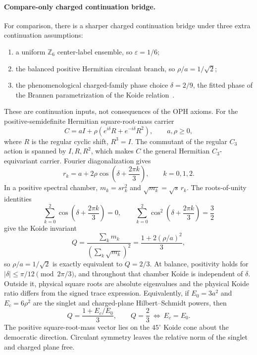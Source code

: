 \documentclass[11pt]{article}
\begin{document}
\paragraph{Compare-only charged continuation bridge.}
For comparison, there is a sharper charged continuation bridge under three extra continuation
assumptions:
\begin{enumerate}[leftmargin=2em]
\item a uniform \(\mathbb Z_6\) center-label ensemble, so \(\varepsilon = 1/6\);
\item the balanced positive Hermitian circulant branch, so \(\rho/a = 1/\sqrt2\);
\item the phenomenological charged-family phase choice \(\delta = 2/9\), the fitted phase of the
Brannen parametrization of the Koide relation~\cite{koide1983,brannen2006}.
\end{enumerate}
These are continuation inputs, not consequences of the OPH axioms.  For the positive-semidefinite
Hermitian square-root-mass carrier
\[
C=aI+\rho\left(e^{i\delta}R+e^{-i\delta}R^2\right),
\qquad a,\rho\geq0,
\]
where \(R\) is the regular cyclic shift, \(R^3=I\).  The commutant of the regular \(C_3\)
action is spanned by \(I,R,R^2\), which makes \(C\) the general Hermitian
\(C_3\)-equivariant carrier. Fourier diagonalization gives
\[
r_k=a+2\rho\cos\!\left(\delta+\frac{2\pi k}{3}\right),
\qquad k=0,1,2.
\]
In a positive spectral chamber, \(m_k=s r_k^2\) and
\(\sqrt{m_k}=\sqrt{s}\,r_k\).  The roots-of-unity identities
\[
\sum_{k=0}^2\cos\!\left(\delta+\frac{2\pi k}{3}\right)=0,
\qquad
\sum_{k=0}^2\cos^2\!\left(\delta+\frac{2\pi k}{3}\right)=\frac32
\]
give the Koide invariant
\[
Q=\frac{\sum_km_k}{(\sum_k\sqrt{m_k})^2}
 =\frac{1+2(\rho/a)^2}{3},
\]
so \(\rho/a=1/\sqrt2\) is exactly equivalent to \(Q=2/3\).  At balance, positivity holds for
\(|\delta|\leq\pi/12\pmod{2\pi/3}\), and throughout that chamber Koide is independent of
\(\delta\). Outside it, physical square roots are absolute eigenvalues and the physical Koide
ratio differs from the signed trace expression. Equivalently, if
\(E_0=3a^2\) and \(E_c=6\rho^2\) are the singlet and charged-plane Hilbert--Schmidt powers, then
\[
Q=\frac{1+E_c/E_0}{3},
\qquad
Q=\frac23\ \Longleftrightarrow\ E_c=E_0.
\]
The positive square-root-mass vector lies on the \(45^\circ\) Koide cone about the democratic
direction. Circulant symmetry leaves the relative norm of the singlet and charged plane free.
\end{document}
